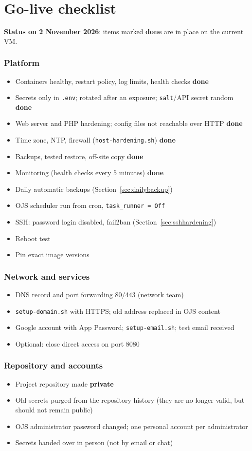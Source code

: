 \documentclass[11pt,a4paper]{report}
\newcommand{\DocDate}{2 November 2026}
\newcommand{\code}[1]{\texttt{\small #1}}
\newcommand{\file}[1]{\texttt{\small #1}}
\newcommand{\checkitem}{\item[$\square$]}
\begin{document}
\chapter{Go-live checklist}\label{ch:golive}

\textbf{Status on \DocDate}: items marked \textcolor{okgreen}{\textbf{done}} are in place on the
current VM.

\subsection*{Platform}
\begin{itemize}[label={}]
  \checkitem Containers healthy, restart policy, log limits, health checks \hfill \textcolor{okgreen}{\textbf{done}}
  \checkitem Secrets only in \file{.env}; rotated after an exposure; \code{salt}/API secret random \hfill \textcolor{okgreen}{\textbf{done}}
  \checkitem Web server and PHP hardening; config files not reachable over HTTP \hfill \textcolor{okgreen}{\textbf{done}}
  \checkitem Time zone, NTP, firewall (\file{host-hardening.sh}) \hfill \textcolor{okgreen}{\textbf{done}}
  \checkitem Backups, tested restore, off-site copy \hfill \textcolor{okgreen}{\textbf{done}}
  \checkitem Monitoring (health checks every 5 minutes) \hfill \textcolor{okgreen}{\textbf{done}}
  \checkitem Daily automatic backups (Section~\ref{sec:dailybackup})
  \checkitem OJS scheduler run from cron, \code{task\_runner = Off}
  \checkitem SSH: password login disabled, fail2ban (Section~\ref{sec:sshhardening})
  \checkitem Reboot test
  \checkitem Pin exact image versions
\end{itemize}

\subsection*{Network and services}
\begin{itemize}[label={}]
  \checkitem DNS record and port forwarding 80/443 (network team)
  \checkitem \file{setup-domain.sh} with HTTPS; old address replaced in OJS content
  \checkitem Google account with App Password; \file{setup-email.sh}; test email received
  \checkitem Optional: close direct access on port 8080
\end{itemize}

\subsection*{Repository and accounts}
\begin{itemize}[label={}]
  \checkitem Project repository made \textbf{private}
  \checkitem Old secrets purged from the repository history (they are no longer valid, but should not remain public)
  \checkitem OJS administrator password changed; one personal account per administrator
  \checkitem Secrets handed over in person (not by email or chat)
\end{itemize}
\end{document}
